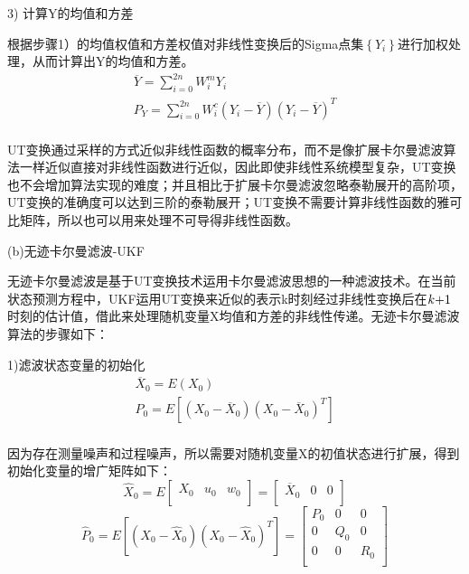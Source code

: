 3) 计算Y的均值和方差

根据步骤1）的均值权值和方差权值对非线性变换后的Sigma点集$\left\{ {{Y}_{i}} \right\}$进行加权处理，从而计算出Y的均值和方差。
\begin{equation}\label{3-28}
\begin{array}{l}
   \overline{Y}=\sum\limits_{i=0}^{2n}{W_{i}^{m}{{Y}_{i}}} \\ 
  {{P}_{Y}}=\sum\limits_{i=0}^{2n}{W_{i}^{c}({{Y}_{i}}-\overline{Y}){{({{Y}_{i}}-\overline{Y})}^{T}}} \\ 
\end{array}
\end{equation}

UT变换通过采样的方式近似非线性函数的概率分布，而不是像扩展卡尔曼滤波算法一样近似直接对非线性函数进行近似，因此即使非线性系统模型复杂，UT变换也不会增加算法实现的难度；并且相比于扩展卡尔曼滤波忽略泰勒展开的高阶项，UT变换的准确度可以达到三阶的泰勒展开；UT变换不需要计算非线性函数的雅可比矩阵，所以也可以用来处理不可导得非线性函数。

(b)无迹卡尔曼滤波-UKF

	无迹卡尔曼滤波是基于UT变换技术运用卡尔曼滤波思想的一种滤波技术。在当前状态预测方程中，UKF运用UT变换来近似的表示k时刻经过非线性变换后在$k\\{\rm{ + }}1$时刻的估计值，借此来处理随机变量X均值和方差的非线性传递。无迹卡尔曼滤波算法的步骤如下：

1)滤波状态变量的初始化
\begin{equation}
\begin{array}{l}
   {{\overline{X}}_{0}}=E\left( {{X}_{0}} \right) \\ 
  {{P}_{0}}=E\left[ \left( {{X}_{0}}-{{\overline{X}}_{0}} \right){{\left( {{X}_{0}}-{{\overline{X}}_{0}} \right)}^{T}} \right] \\ 
\end{array}
\end{equation}

因为存在测量噪声和过程噪声，所以需要对随机变量X的初值状态进行扩展，得到初始化变量的增广矩阵如下：
\begin{equation}
{{\widehat{X}}_{0}}=E\left[ \begin{matrix}
   {{X}_{0}} & {{u}_{0}} & {{w}_{0}}  \\
\end{matrix} \right]=\left[ \begin{matrix}
   {{\overline{X}}_{0}} & 0 & 0  \\
\end{matrix} \right]
\end{equation}
\begin{equation}
{{\widehat{P}}_{0}}=E\left[ \left( {{X}_{0}}-{{\widehat{X}}_{0}} \right){{\left( {{X}_{0}}-{{\widehat{X}}_{0}} \right)}^{T}} \right]=\left[ \begin{matrix}
   {{P}_{0}} & 0 & 0  \\
   0 & {{Q}_{0}} & 0  \\
   0 & 0 & {{R}_{0}}  \\
\end{matrix} \right]
\end{equation}

